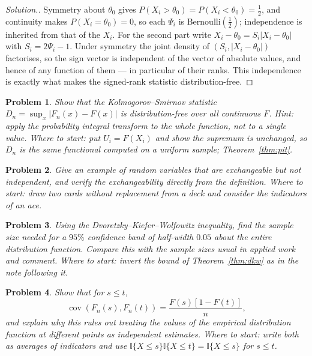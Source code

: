 \documentclass[12pt,a4paper]{report}
\theoremstyle{definition}
\theoremstyle{plain}
\newtheorem{problemx}{Problem}[section]
\newenvironment{problem}{\begin{problemx}}{\end{problemx}}
\newenvironment{solution}
  {\renewcommand{\qedsymbol}{}\begin{proof}[\textit{Solution}.]}
  {\end{proof}}
\begin{document}
\begin{solution}
Symmetry about $\theta_0$ gives
$P(X_i>\theta_0)=P(X_i<\theta_0)=\tfrac12$, and continuity makes
$P(X_i=\theta_0)=0$, so each $\Psi_i$ is Bernoulli$(\tfrac12)$; independence is
inherited from that of the $X_i$. For the second part write
$X_i-\theta_0 = S_i\left|X_i-\theta_0\right|$ with $S_i = 2\Psi_i - 1$. Under
symmetry the joint density of $(S_i,|X_i-\theta_0|)$ factorises, so the sign
vector is independent of the vector of absolute values, and hence of any
function of them --- in particular of their ranks. This independence is exactly
what makes the signed-rank statistic distribution-free.
\end{solution}

\begin{problem}
Show that the Kolmogorov--Smirnov statistic
$D_n=\sup_x\left|F_n(x)-F(x)\right|$ is distribution-free over all continuous
$F$. \emph{Hint: apply the probability integral transform to the whole
function, not to a single value.}
\emph{Where to start: put $U_i=F(X_i)$ and show the supremum is unchanged, so $D_n$ is the same functional computed on a uniform sample; Theorem~\ref{thm:pit}.}
\end{problem}

\begin{problem}
Give an example of random variables that are exchangeable but not independent,
and verify the exchangeability directly from the definition.
\emph{Where to start: draw two cards without replacement from a deck and consider the indicators of an ace.}
\end{problem}

\begin{problem}
Using the Dvoretzky--Kiefer--Wolfowitz inequality, find the sample size needed
for a $95\%$ confidence band of half-width $0.05$ about the entire distribution
function. Compare this with the sample sizes usual in applied work and comment.
\emph{Where to start: invert the bound of Theorem~\ref{thm:dkw} as in the note following it.}
\end{problem}

\begin{problem}
Show that for $s\leq t$,
$$\operatorname{cov}\left(F_n(s),F_n(t)\right)
= \frac{F(s)\left[1-F(t)\right]}{n},$$
and explain why this rules out treating the values of the empirical
distribution function at different points as independent estimates.
\emph{Where to start: write both as averages of indicators and use $\mathbb{I}\{X\leq s\}\mathbb{I}\{X\leq t\} = \mathbb{I}\{X\leq s\}$ for $s \leq t$.}
\end{problem}
\end{document}
